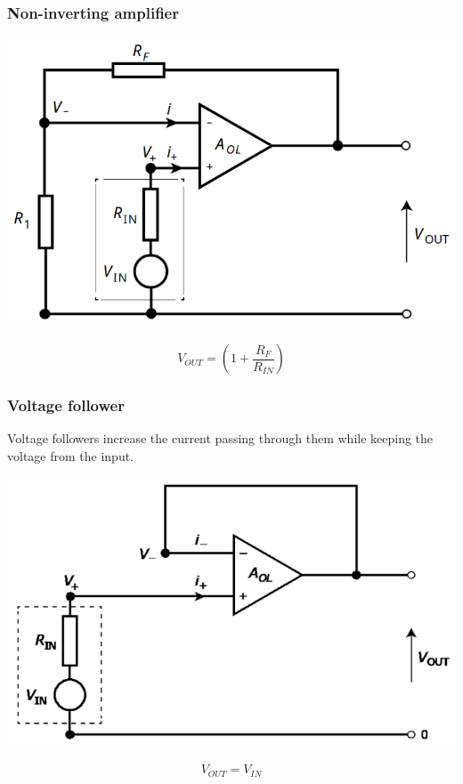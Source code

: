 \documentclass[11pt]{article}
\begin{document}
\subsubsection{Non-inverting amplifier}
\label{sec:orgb8d0ceb}
\begin{center}
\includegraphics[width=.9\linewidth]{./images/non-inverting-amplifier.png}
\end{center}
\[V_{OUT} = \left(1 + \frac{R_F}{R_{IN}} \right)\]

\subsubsection{Voltage follower}
\label{sec:org08a849e}
Voltage followers increase the current passing through them while keeping the voltage from the input.
\begin{center}
\includegraphics[width=.9\linewidth]{./images/voltage-follower.png}
\end{center}
\[V_{OUT} = V_{IN}\]
\end{document}
